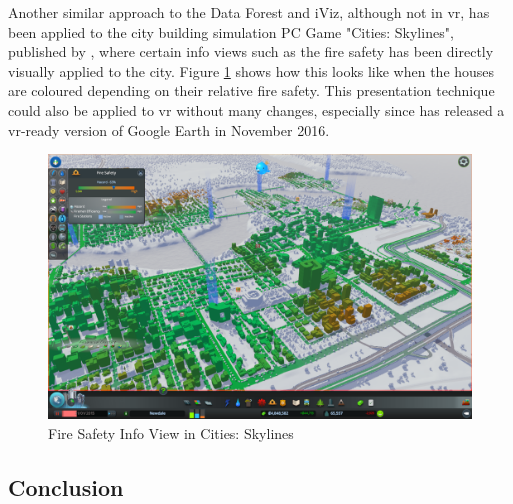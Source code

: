 Another similar approach to the Data Forest and iViz, although not in \gls{vr}, has been applied to the city building simulation PC Game "Cities: Skylines", published by \cite{Paradox2014}, where certain info views such as the fire safety has been directly visually applied to the city. Figure \ref{fig:citiesskylinesfiresafety} shows how this looks like when the houses are coloured depending on their relative fire safety. This presentation technique could also be applied to \gls{vr} without many changes, especially since \cite{Google2016a} has released a \gls{vr}-ready version of Google Earth in November 2016.
\begin{figure}[b]
	\begin{center}
		\includegraphics[width=12cm]{03_Figures/05_LitReview/ParadoxWiki2014_CitiesSkylines.png}
		\caption[Fire Safety Info View in Cities: Skylines]{Fire Safety Info View in Cities: Skylines \citep{Paradox2014}}
		\label{fig:citiesskylinesfiresafety}
	\end{center}
\end{figure}



\subsection{Conclusion}

